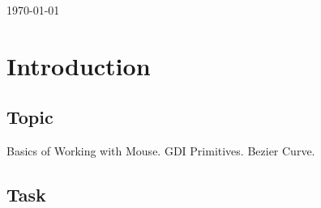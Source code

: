 \documentclass[12pt]{article}
\begin{document}
\begin{titlepage}
\begin{center}
      \vspace{5 mm}


      {\large \today}\\[3cm] %




      \vfill %
      \end{center}
      \end{titlepage}



  \section{Introduction}

  \subsection{Topic}

  
Basics of Working with Mouse. GDI Primitives. Bezier Curve.

  \subsection{Task}
\end{document}

